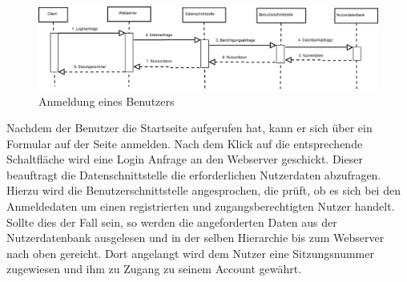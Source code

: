 \begin{figure}[h]
	\hspace{-0.25\linewidth}\includegraphics[width=1.5\linewidth]{Grafik/Diagramm/Szenarios/Login}
	\caption[]{Anmeldung eines Benutzers}
\end{figure}

\noindent Nachdem der Benutzer die Startseite aufgerufen hat, kann er sich über ein Formular auf der Seite anmelden. Nach dem Klick auf die entsprechende Schaltfläche wird eine Login Anfrage an den Webserver geschickt. Dieser beauftragt die Datenschnittstelle die erforderlichen Nutzerdaten abzufragen. Hierzu wird die Benutzerschnittstelle angesprochen, die prüft, ob es sich bei den Anmeldedaten um einen registrierten und zugangsberechtigten Nutzer handelt. Sollte dies der Fall sein, so werden die angeforderten Daten aus der Nutzerdatenbank ausgelesen und in der selben Hierarchie bis zum Webserver nach oben gereicht. Dort angelangt wird dem Nutzer eine Sitzungsnummer zugewiesen und ihm zu Zugang zu seinem Account gewährt. 